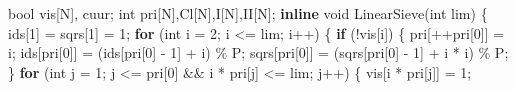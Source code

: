 \documentclass[
]{article}
\newenvironment{Shaded}{}{}
\newcommand{\ControlFlowTok}[1]{\textcolor[rgb]{0.00,0.44,0.13}{\textbf{#1}}}
\newcommand{\DataTypeTok}[1]{\textcolor[rgb]{0.56,0.13,0.00}{#1}}
\newcommand{\DecValTok}[1]{\textcolor[rgb]{0.25,0.63,0.44}{#1}}
\newcommand{\KeywordTok}[1]{\textcolor[rgb]{0.00,0.44,0.13}{\textbf{#1}}}
\newcommand{\NormalTok}[1]{#1}
\newcommand{\OperatorTok}[1]{\textcolor[rgb]{0.40,0.40,0.40}{#1}}
\begin{document}
\begin{Shaded}
\begin{Highlighting}[]
    \DataTypeTok{bool}\NormalTok{ vis}\OperatorTok{[}\NormalTok{N}\OperatorTok{],}\NormalTok{ cuur}\OperatorTok{;}
    \DataTypeTok{int}\NormalTok{ pri}\OperatorTok{[}\NormalTok{N}\OperatorTok{],}\NormalTok{Cl}\OperatorTok{[}\NormalTok{N}\OperatorTok{],}\NormalTok{I}\OperatorTok{[}\NormalTok{N}\OperatorTok{],}\NormalTok{II}\OperatorTok{[}\NormalTok{N}\OperatorTok{];}
    \KeywordTok{inline} \DataTypeTok{void}\NormalTok{ LinearSieve}\OperatorTok{(}\DataTypeTok{int}\NormalTok{ lim}\OperatorTok{)}
    \OperatorTok{\{}
\NormalTok{        ids}\OperatorTok{[}\DecValTok{1}\OperatorTok{]} \OperatorTok{=}\NormalTok{ sqrs}\OperatorTok{[}\DecValTok{1}\OperatorTok{]} \OperatorTok{=} \DecValTok{1}\OperatorTok{;}
        \ControlFlowTok{for} \OperatorTok{(}\DataTypeTok{int}\NormalTok{ i }\OperatorTok{=} \DecValTok{2}\OperatorTok{;}\NormalTok{ i }\OperatorTok{\textless{}=}\NormalTok{ lim}\OperatorTok{;}\NormalTok{ i}\OperatorTok{++)}
        \OperatorTok{\{}
            \ControlFlowTok{if} \OperatorTok{(!}\NormalTok{vis}\OperatorTok{[}\NormalTok{i}\OperatorTok{])}
            \OperatorTok{\{}
\NormalTok{                pri}\OperatorTok{[++}\NormalTok{pri}\OperatorTok{[}\DecValTok{0}\OperatorTok{]]} \OperatorTok{=}\NormalTok{ i}\OperatorTok{;}
\NormalTok{                ids}\OperatorTok{[}\NormalTok{pri}\OperatorTok{[}\DecValTok{0}\OperatorTok{]]} \OperatorTok{=} \OperatorTok{(}\NormalTok{ids}\OperatorTok{[}\NormalTok{pri}\OperatorTok{[}\DecValTok{0}\OperatorTok{]} \OperatorTok{{-}} \DecValTok{1}\OperatorTok{]} \OperatorTok{+}\NormalTok{ i}\OperatorTok{)} \OperatorTok{\%}\NormalTok{ P}\OperatorTok{;}
\NormalTok{                sqrs}\OperatorTok{[}\NormalTok{pri}\OperatorTok{[}\DecValTok{0}\OperatorTok{]]} \OperatorTok{=} \OperatorTok{(}\NormalTok{sqrs}\OperatorTok{[}\NormalTok{pri}\OperatorTok{[}\DecValTok{0}\OperatorTok{]} \OperatorTok{{-}} \DecValTok{1}\OperatorTok{]} \OperatorTok{+}\NormalTok{ i }\OperatorTok{*}\NormalTok{ i}\OperatorTok{)} \OperatorTok{\%}\NormalTok{ P}\OperatorTok{;}
            \OperatorTok{\}}
            \ControlFlowTok{for} \OperatorTok{(}\DataTypeTok{int}\NormalTok{ j }\OperatorTok{=} \DecValTok{1}\OperatorTok{;}\NormalTok{ j }\OperatorTok{\textless{}=}\NormalTok{ pri}\OperatorTok{[}\DecValTok{0}\OperatorTok{]} \OperatorTok{\&\&}\NormalTok{ i }\OperatorTok{*}\NormalTok{ pri}\OperatorTok{[}\NormalTok{j}\OperatorTok{]} \OperatorTok{\textless{}=}\NormalTok{ lim}\OperatorTok{;}\NormalTok{ j}\OperatorTok{++)}
            \OperatorTok{\{}
\NormalTok{                vis}\OperatorTok{[}\NormalTok{i }\OperatorTok{*}\NormalTok{ pri}\OperatorTok{[}\NormalTok{j}\OperatorTok{]]} \OperatorTok{=} \DecValTok{1}\OperatorTok{;}

\end{Highlighting}
\end{Shaded}
\end{document}
